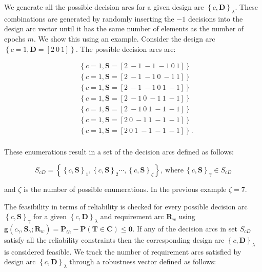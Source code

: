 We generate all the possible decision arcs for a given design arc $\left\{c,\mathbf{D}\right\}_\lambda$. These combinations are generated by randomly inserting the $-1$ decisions into the design arc vector until it has the same number of elements as the number of epochs $m$. We show this using an example. Consider the design arc $\left\{c = 1,\mathbf{D} = \left[2 ~ 0 ~ 1\right]\right\}$. The possible decision arcs are:

\begin{equation*}
	\begin{aligned}
		& \left\{c = 1,\mathbf{S} = \left[2 ~ -1 ~ -1 ~ -1 ~ 0 ~ 1\right]\right\}\\
		& \left\{c = 1,\mathbf{S} = \left[2 ~ -1 ~ -1 ~ 0 ~ -1 ~ 1\right]\right\}\\
		& \left\{c = 1,\mathbf{S} = \left[2 ~ -1 ~ -1 ~ 0 ~ 1 ~ -1\right]\right\}\\
		& \left\{c = 1,\mathbf{S} = \left[2 ~ -1 ~ 0 ~ -1 ~ 1 ~ -1\right]\right\}\\
		& \left\{c = 1,\mathbf{S} = \left[2 ~ -1 ~ 0 ~ 1 ~ -1 ~ -1\right]\right\}\\
		& \left\{c = 1,\mathbf{S} = \left[2 ~ 0 ~ -1 ~ 1 ~ -1 ~ -1\right]\right\}\\
		& \left\{c = 1,\mathbf{S} = \left[2 ~ 0 ~ 1 ~ -1 ~ -1 ~ -1\right]\right\}.\\
	\end{aligned}
\end{equation*}

These enumerations result in a set of the decision arcs defined as follows:

\begin{equation} \label{eq:enumeratedcS}
	S_{cD} = \left\{\left\{c,\mathbf{S}\right\}_{1},\left\{c,\mathbf{S}\right\}_{2}\cdots,\left\{c,\mathbf{S}\right\}_{\zeta}\right\},\mathrm{~where~} \left\{c,\mathbf{S}\right\}_{\gamma} \in S_{cD}
\end{equation}

and $\zeta$ is the number of possible enumerations. In the previous example $\zeta = 7$.

The feasibility in terms of reliability is checked for every possible decision arc $\left\{c,\mathbf{S}\right\}_{\gamma}$ for a given $\left\{c,\mathbf{D}\right\}_\lambda$ and requirement arc $\mathbf{R}_w$ using $\mathbf{g}(c_{\gamma},\mathbf{S}_{\gamma};\mathbf{R}_w) = \mathbf{P}_{th} - \mathbf{P}(\mathbf{T} \in \mathbf{C}) \le \mathbf{0}$. If any of the decision arcs in set $S_{cD}$ satisfy all the reliability constraints then the corresponding design arc $\left\{c,\mathbf{D}\right\}_\lambda$ is considered feasible. We track the number of requirement arcs satisfied by design arc $\left\{c,\mathbf{D}\right\}_\lambda$ through a robustness vector defined as follows:

